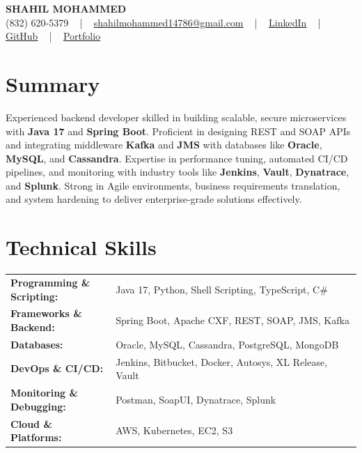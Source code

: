 \documentclass[letterpaper,11pt]{article}
\begin{document}
\begin{center}
    {\fontsize{14pt}{12pt}\selectfont \textbf{\MakeUppercase{Shahil Mohammed}}}\\ \vspace{2pt}
    \fontsize{10pt}{12pt}\selectfont (832) 620-5379 ~ | ~ \href{mailto:shahilmohammed14786@gmail.com}{shahilmohammed14786@gmail.com} ~ | ~  
    \href{https://www.linkedin.com/in/shahil-mohammed-9652931a1/}{\color{blue}\underline{LinkedIn}}  ~ | ~ 
    \href{https://github.com/freakbeast14}{\color{blue}\underline{GitHub}} ~ | ~ 
    \href{https://shahil-mohammed.netlify.app/}{\color{blue}\underline{Portfolio}}
    \vspace{-8pt}
\end{center}

\section{Summary}
\fontsize{9pt}{10pt}\selectfont
Experienced backend developer skilled in building scalable, secure microservices with \textbf{Java 17} and \textbf{Spring Boot}. Proficient in designing REST and SOAP APIs and integrating middleware \textbf{Kafka} and \textbf{JMS} with databases like \textbf{Oracle}, \textbf{MySQL}, and \textbf{Cassandra}. Expertise in performance tuning, automated CI/CD pipelines, and monitoring with industry tools like \textbf{Jenkins}, \textbf{Vault}, \textbf{Dynatrace}, and \textbf{Splunk}. Strong in Agile environments, business requirements translation, and system hardening to deliver enterprise-grade solutions effectively.
 \vspace{-5pt}
 
\section{Technical Skills}
        \vspace{-14pt}
        \begin{table}[h]
            \fontsize{9pt}{10pt}\selectfont
            \begin{tabular}{p{0.3\linewidth} p{0.7\linewidth}}
                \textbf{Programming \& Scripting:} & Java 17, Python, Shell Scripting, TypeScript, C\# \\
                \textbf{Frameworks \& Backend:} & Spring Boot, Apache CXF, REST, SOAP, JMS, Kafka \\
                \textbf{Databases:} & Oracle, MySQL, Cassandra, PostgreSQL, MongoDB \\
                \textbf{DevOps \& CI/CD:} & Jenkins, Bitbucket, Docker, Autosys, XL Release, Vault \\
                \textbf{Monitoring \& Debugging:} & Postman, SoapUI, Dynatrace, Splunk \\
                \textbf{Cloud \& Platforms:} & AWS, Kubernetes, EC2, S3 \\
            \end{tabular}
        \end{table}
 \vspace{-15pt}
 
\end{document}
